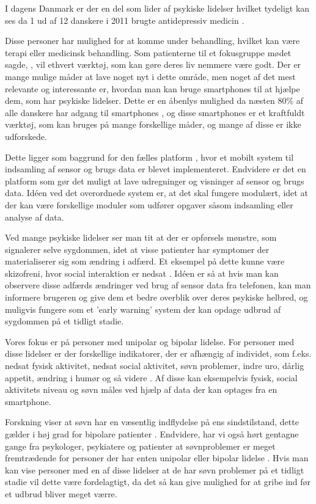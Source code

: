 I dagens Danmark er der en del som lider af psykiske lidelser hvilket tydeligt kan ses da 1 ud af 12 danskere i 2011 brugte antidepressiv medicin \citep{misc:forbrugAntidepressiva}. 

Disse personer har mulighed for at komme under behandling, hvilket kan være terapi eller medicinsk behandling.
Som patienterne til et fokusgruppe mødet sagde, \citep[Kapitel 1, Sektion 5]{misc:faellesrapp}, vil ethvert værktøj, som kan gøre deres liv nemmere være godt.
Der er mange mulige måder at lave noget nyt i dette område, men noget af det mest relevante og interessante er, hvordan man kan bruge smartphones til at hjælpe dem, som har psykiske lidelser.
Dette er en åbenlys mulighed da næsten 80\% af alle danskere har adgang til smartphones \citep{misc:dstElektronik}, og disse smartphones er et kraftfuldt værktøj, som kan bruges på mange forskellige måder, og mange af disse er ikke udforskede.

Dette ligger som baggrund for den fælles platform \citep{misc:faellesrapp}, hvor et mobilt system til indsamling af sensor og brugs data er blevet implementeret. 
Endvidere er det en platform som gør det muligt at lave udregninger og visninger af sensor og brugs data.
Idéen ved det overordnede system er, at det skal fungere modulært, idet at der kan være forskellige moduler som udfører opgaver såsom indsamling eller analyse af data.

Ved mange psykiske lidelser ser man tit at der er opførsels mønstre, som signalerer selve sygdommen, idet at visse patienter har symptomer der materialiserer sig som ændring i adfærd.
Et eksempel på dette kunne være skizofreni, hvor social interaktion er nedsat \citep{misc:negativeSymptomsSchizo}.
Idéen er så at hvis man kan observere disse adfærds ændringer ved brug af sensor data fra telefonen, kan man informere brugeren og give dem et bedre overblik over deres psykiske helbred, og muligvis fungere som et 'early warning' system der kan opdage udbrud af sygdommen på et tidligt stadie.

Vores fokus er på personer med unipolar og bipolar lidelse. 
For personer med disse lidelser er der forskellige indikatorer, der er afhængig af individet, som f.eks. nedsat fysisk aktivitet, nedsat social aktivitet, søvn problemer, indre uro, dårlig appetit, ændring i humør og så videre \citep{misc:faellesrapp}.
Af disse kan eksempelvis fysisk, social aktivitets niveau og søvn måles ved hjælp af data der kan optages fra en smartphone.

Forskning viser at søvn har en væsentlig indflydelse på ens sindstilstand, dette gælder i høj grad for bipolare patienter \citep{CPSP:CPSP1164}.
Endvidere, har vi også hørt gentagne gange fra psykologer, psykiatere og patienter at søvnproblemer er meget fremtrædende for personer der har enten unipolar eller bipolar lidelse \citep[Kapitel 2, Sektion 3,4,5]{misc:faellesrapp}.
Hvis man kan vise personer med en af disse lidelser at de har søvn problemer på et tidligt stadie vil dette være fordelagtigt, da det så kan give mulighed for at gribe ind før et udbrud bliver meget værre.

